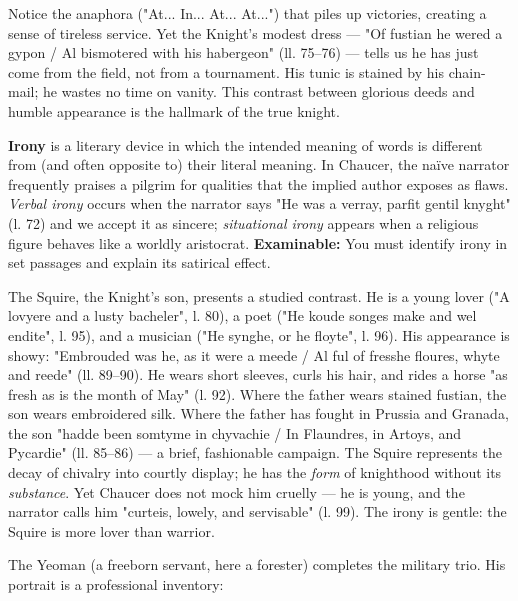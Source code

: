\documentclass[11pt]{article}
\newcommand{\cle}[1]{{\popxbold\color{popdark}#1}}
\begin{document}
Notice the \cle{anaphora} ("At... In... At... At...") that piles up victories, creating a sense of tireless service. Yet the Knight's \cle{modest dress} — "Of fustian he wered a gypon / Al bismotered with his habergeon" (ll. 75–76) — tells us he has just come from the field, not from a tournament. His tunic is stained by his chain-mail; he wastes no time on vanity. This contrast between \cle{glorious deeds} and \cle{humble appearance} is the hallmark of the \cle{true knight}.

\begin{definition}[Irony]
\textbf{Irony} is a literary device in which the intended meaning of words is different from (and often opposite to) their literal meaning. In Chaucer, the \cle{naïve narrator} frequently praises a pilgrim for qualities that the \cle{implied author} exposes as flaws. \emph{Verbal irony} occurs when the narrator says "He was a verray, parfit gentil knyght" (l. 72) and we accept it as sincere; \emph{situational irony} appears when a religious figure behaves like a worldly aristocrat. \textbf{Examinable:} You must identify irony in set passages and explain its satirical effect.
\end{definition}

The \cle{Squire}, the Knight's son, presents a studied contrast. He is a \cle{young lover} ("A lovyere and a lusty bacheler", l. 80), a \cle{poet} ("He koude songes make and wel endite", l. 95), and a \cle{musician} ("He synghe, or he floyte", l. 96). His appearance is \cle{showy}: "Embrouded was he, as it were a meede / Al ful of fresshe floures, whyte and reede" (ll. 89–90). He wears short sleeves, curls his hair, and rides a horse "as fresh as is the month of May" (l. 92). Where the father wears stained fustian, the son wears embroidered silk. Where the father has fought in Prussia and Granada, the son "hadde been somtyme in chyvachie / In Flaundres, in Artoys, and Pycardie" (ll. 85–86) — a brief, fashionable campaign. The Squire represents the \cle{decay of chivalry into courtly display}; he has the \emph{form} of knighthood without its \emph{substance}. Yet Chaucer does not mock him cruelly — he is young, and the narrator calls him "curteis, lowely, and servisable" (l. 99). The irony is gentle: the Squire is \cle{more lover than warrior}.

The \cle{Yeoman} (a freeborn servant, here a forester) completes the military trio. His portrait is a \cle{professional inventory}:
\end{document}
